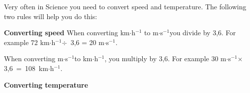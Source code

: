         
        \label{m30853*id67266}Very often in Science you need to convert speed and temperature. The following two rules will help you do this:\par 
        \label{m30853*id67270}\textbf{Converting speed}
When converting km\begin{math}\ensuremath{\cdot}\end{math}h\begin{math}{}^{-1}\end{math} to m\begin{math}\ensuremath{\cdot}\end{math}s\begin{math}{}^{-1}\end{math}you divide by 3,6. For example 72 km\begin{math}\ensuremath{\cdot}\end{math}h\begin{math}{}^{-1}\end{math}\begin{math}÷\end{math}~3,6 = 20 m\begin{math}\ensuremath{\cdot}\end{math}s\begin{math}{}^{-1}\end{math}.\par 
        \label{m30853*id67389}When converting m\begin{math}\ensuremath{\cdot}\end{math}s\begin{math}{}^{-1}\end{math}to km\begin{math}\ensuremath{\cdot}\end{math}h\begin{math}{}^{-1}\end{math}, you multiply by 3,6. For example 30 m\begin{math}\ensuremath{\cdot}\end{math}s\begin{math}{}^{-1}\end{math}\begin{math}\ensuremath{\times}\end{math}3,6~=~108~km\begin{math}\ensuremath{\cdot}\end{math}h\begin{math}{}^{-1}\end{math}.\par 
        \label{m30853*id67500}\textbf{Converting temperature}
